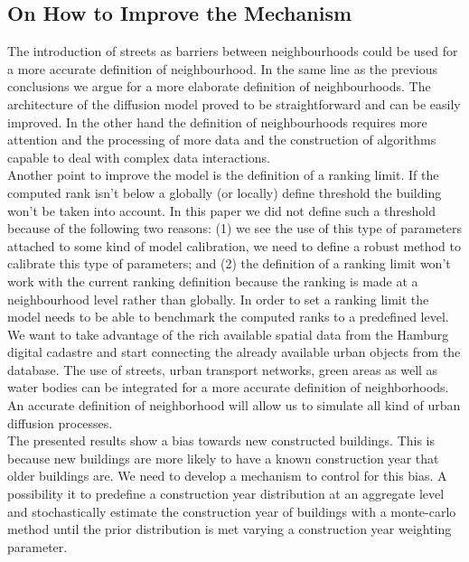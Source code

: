 \subsection{On How to Improve the Mechanism}

The introduction of streets as barriers between neighbourhoods could be used
for a more accurate definition of neighbourhood. In the same line as the
previous conclusions we argue for a more elaborate definition of
neighbourhoods. The architecture of the diffusion model proved to be
straightforward and can be easily improved. In the other hand the definition
of neighbourhoods requires more attention and the processing of more data and
the construction of algorithms capable to deal with complex data
interactions.\\

Another point to improve the model is the definition of a ranking limit. If the
computed rank isn't below a globally (or locally) define threshold the building
won't be taken into account. In this paper we did not define such a threshold
because of the following two reasons: (1) we see the use of this type of
parameters attached to some kind of model calibration, we need to define a
robust method to calibrate this type of parameters; and (2) the definition of a
ranking limit won't work with the current ranking definition because the
ranking is made at a neighbourhood level rather than globally. In order to set
a ranking limit the model needs to be able to benchmark the computed ranks to a
predefined level.\\

We want to take advantage of the rich available spatial data from the Hamburg
digital cadastre and start connecting the already available urban objects from
the database. The use of streets, urban transport networks, green areas as well
as water bodies can be integrated for a more accurate definition of
neighborhoods. An accurate definition of neighborhood will allow us to simulate
all kind of urban diffusion processes.\\

The presented results show a bias towards new constructed buildings. This is
because new buildings are more likely to have a known construction year that
older buildings are. We need to develop a mechanism to control for this bias. A
possibility it to predefine a construction year distribution at an aggregate
level and stochastically estimate the construction year of buildings with a
monte-carlo method until the prior distribution is met varying a construction
year weighting parameter.\\
